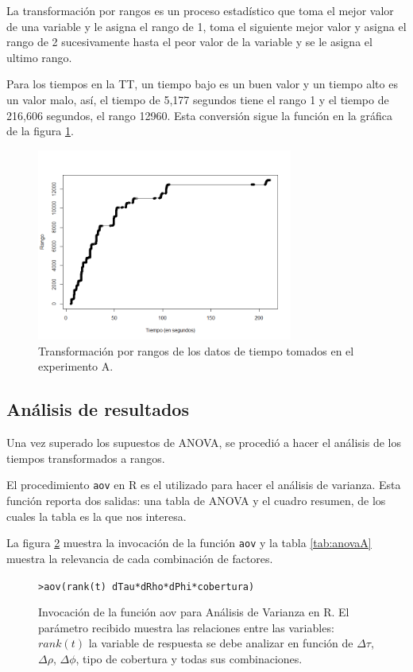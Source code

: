 La transformación por rangos es un proceso estadístico que toma el mejor valor de una variable y le asigna el rango de 1, toma el siguiente mejor valor y asigna el rango de 2 sucesivamente hasta el peor valor de la variable y se le asigna el ultimo rango. 

Para los tiempos en la TT, un tiempo bajo es un buen valor y un tiempo alto es un valor malo, así, el tiempo de 5,177 segundos tiene el rango 1 y el tiempo de 216,606 segundos, el rango 12960. Esta conversión sigue la función en la gráfica de la figura \ref{fig:rank-t}.

\begin{figure}[H]
    \centering
    \includegraphics[width=0.75\textwidth]{images/t/rank.png}
    \caption{Transformación por rangos de los datos de tiempo tomados en el experimento A.}
    \label{fig:rank-t}
\end{figure}

\subsection{Análisis de resultados}

Una vez superado los supuestos de ANOVA, se procedió a hacer el análisis de los tiempos transformados a rangos.

El procedimiento \texttt{aov} en R es el utilizado para hacer el análisis de varianza. Esta función reporta dos salidas: una tabla de ANOVA y el cuadro resumen, de los cuales la tabla es la que nos interesa.

La figura \ref{fig:anova-t} muestra la invocación de la función \texttt{aov} y la tabla \ref{tab:anovaA} muestra la relevancia de cada combinación de factores.

\begin{figure}[H]
    \centering
            \small
            \begin{alltt}
            
            
            > aov(rank(t) ~ dTau * dRho * dPhi * cobertura)
            \end{alltt}
    \caption{Invocación de la función aov para Análisis de Varianza en R. El parámetro recibido muestra las relaciones entre las variables: $rank(t)$ la variable de respuesta se debe analizar en función de $\Delta \tau$, $\Delta \rho$, $\Delta \phi$, tipo de cobertura y todas sus combinaciones.}
    \label{fig:anova-t}
\end{figure}


